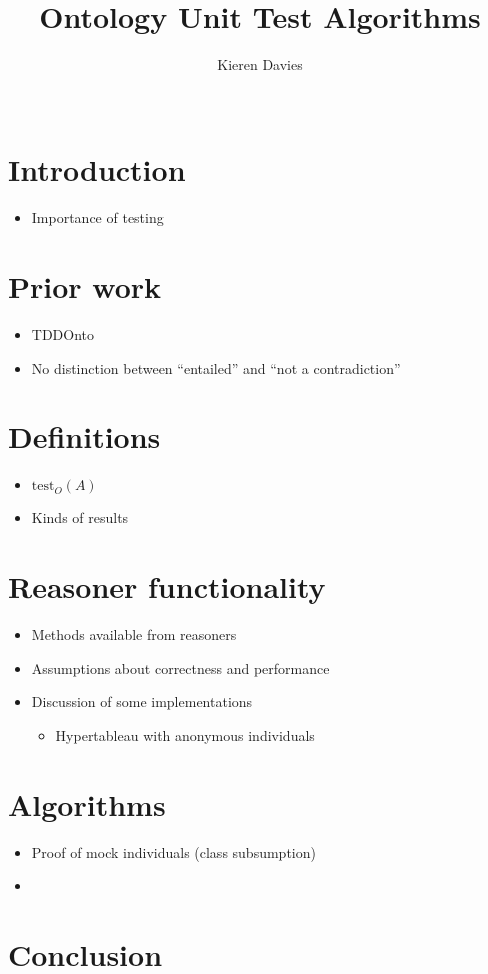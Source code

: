 \documentclass{sig-alternate}
\begin{document}
\title{Ontology Unit Test Algorithms}
\author{
  \alignauthor
  Kieren Davies\\
   \\
}
\maketitle


\section{Introduction}

\begin{itemize}
  \item Importance of testing
\end{itemize}

\section{Prior work}

\begin{itemize}
  \item TDDOnto
  \item No distinction between ``entailed'' and ``not a contradiction''
\end{itemize}

\section{Definitions}

\begin{itemize}
  \item $\mathrm{test}_O(A)$
  \item Kinds of results
\end{itemize}

\section{Reasoner functionality}

\begin{itemize}
  \item Methods available from reasoners
  \item Assumptions about correctness and performance
  \item Discussion of some implementations
  \begin{itemize}
    \item Hypertableau with anonymous individuals
  \end{itemize}
\end{itemize}

\section{Algorithms}

\begin{itemize}
  \item Proof of mock individuals (class subsumption)
  \item
\end{itemize}

\section{Conclusion}
\end{document}
